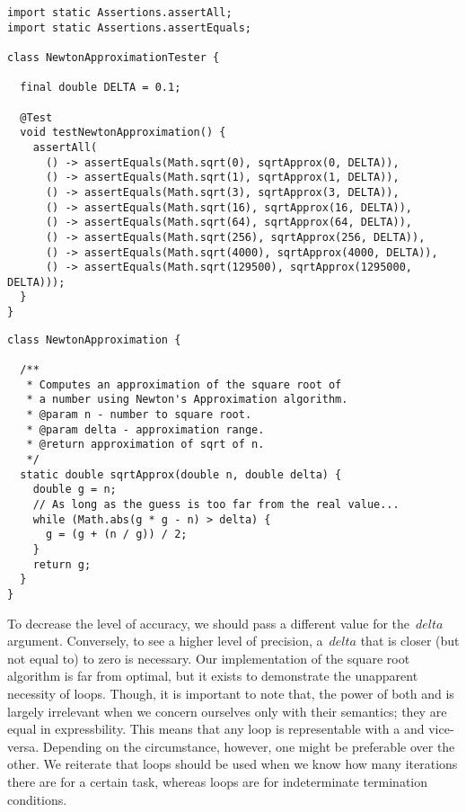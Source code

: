\begin{lstlisting}[language=MyJava]
import static Assertions.assertAll;
import static Assertions.assertEquals;

class NewtonApproximationTester {

  final double DELTA = 0.1;

  @Test
  void testNewtonApproximation() {
    assertAll(
      () -> assertEquals(Math.sqrt(0), sqrtApprox(0, DELTA)),
      () -> assertEquals(Math.sqrt(1), sqrtApprox(1, DELTA)),
      () -> assertEquals(Math.sqrt(3), sqrtApprox(3, DELTA)),
      () -> assertEquals(Math.sqrt(16), sqrtApprox(16, DELTA)),
      () -> assertEquals(Math.sqrt(64), sqrtApprox(64, DELTA)),
      () -> assertEquals(Math.sqrt(256), sqrtApprox(256, DELTA)),
      () -> assertEquals(Math.sqrt(4000), sqrtApprox(4000, DELTA)),
      () -> assertEquals(Math.sqrt(129500), sqrtApprox(1295000, DELTA)));
  }
}
\end{lstlisting}


\begin{lstlisting}[language=MyJava]
class NewtonApproximation {

  /**
   * Computes an approximation of the square root of
   * a number using Newton's Approximation algorithm.
   * @param n - number to square root.
   * @param delta - approximation range.
   * @return approximation of sqrt of n.
   */
  static double sqrtApprox(double n, double delta) {
    double g = n;
    // As long as the guess is too far from the real value...
    while (Math.abs(g * g - n) > delta) {
      g = (g + (n / g)) / 2;
    }
    return g;
  }
}
\end{lstlisting}

To decrease the level of accuracy, we should pass a different value for the~$\mathit{delta}$ argument. 
Conversely, to see a higher level of precision, a~$\mathit{delta}$ that is closer (but not equal to) to zero is necessary. 
Our implementation of the square root algorithm is far from optimal, but it exists to demonstrate the unapparent necessity of  loops. 
Though, it is important to note that, the power of both  and  is largely irrelevant when we concern ourselves only with their semantics; they are equal in expressbility.
This means that any  loop is representable with a  and vice-versa. 
Depending on the circumstance, however, one might be preferable over the other. 
We reiterate that  loops should be used when we know how many iterations there are for a certain task, whereas  loops are for indeterminate termination conditions. 

